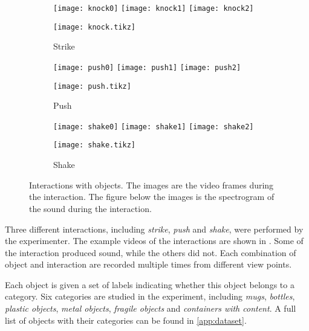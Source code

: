 \documentclass[12pt,final,twoside]{report}
\begin{document}
\begin{figure}[t]
  \centering
  \begin{subfigure}[b]{.8\textwidth}
    \centering
    \texttt{[image: knock0]} \hspace{.4cm}
    \texttt{[image: knock1]} \hspace{.4cm}
    \texttt{[image: knock2]}

    \texttt{[image: knock.tikz]}
    \caption{Strike}
  \end{subfigure}

  \vspace{20pt}
  \begin{subfigure}[b]{.8\textwidth}
    \centering
    \texttt{[image: push0]} \hspace{.4cm}
    \texttt{[image: push1]} \hspace{.4cm}
    \texttt{[image: push2]}

    \texttt{[image: push.tikz]}
    \caption{Push}
  \end{subfigure}

  \vspace{20pt}
  \begin{subfigure}[b]{.8\textwidth}
    \centering
    \texttt{[image: shake0]} \hspace{.4cm}
    \texttt{[image: shake1]} \hspace{.4cm}
    \texttt{[image: shake2]}

    \texttt{[image: shake.tikz]}
    \caption{Shake}
  \end{subfigure}
  \caption[Interactions with objects.]{Interactions with objects. The images are the video frames during the interaction. The figure below the images is the spectrogram of the sound during the interaction.}
  \label{fig:interaction}
\end{figure}

Three different interactions, including \emph{strike}, \emph{push} and \emph{shake}, were performed by the experimenter. The example videos of the interactions are shown in . Some of the interaction produced sound, while the others did not. Each combination of object and interaction are recorded multiple times from different view points.

Each object is given a set of labels indicating whether this object belongs to a category. Six categories are studied in the experiment, including \emph{mugs}, \emph{bottles}, \emph{plastic objects}, \emph{metal objects}, \emph{fragile objects} and \emph{containers with content}.  
A full list of objects with their categories can be found in \cref{app:dataset}. 
\end{document}
